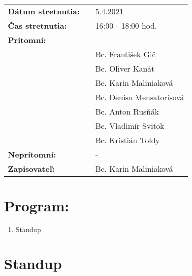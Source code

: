 \documentclass{article}
\begin{document}
    

    \begin{table}[h]
        \begin{tabular}{lllll}
            \multicolumn{3}{l}{\textbf{Dátum stretnutia:}} & & 5.4.2021 \\
            \multicolumn{3}{l}{\textbf{Čas stretnutia:}} & & 16:00 - 18:00 hod. \\
            \multicolumn{3}{l}{\textbf{Prítomní:}} \\
            & & & & Bc. František Gič  \\
            & & & & Bc. Oliver Kanát \\
            & & & & Bc. Karin Maliniaková \\
            & & & & Bc. Denisa Mensatorisová \\
            & & & & Bc. Anton Rusňák \\
            & & & & Bc. Vladimír Svitok \\
            & & & & Bc. Kristián Toldy \\
            \multicolumn{3}{l}{\textbf{Neprítomní:}} & & -\\
            \multicolumn{3}{l}{\textbf{Zapisovateľ:}} & & Bc. Karin Maliniaková \\
        \end{tabular}
        \label{tab:grades}
    \end{table}

    \section*{Program:}

    \begin{enumerate}
        \item Standup
    \end{enumerate}

    \section*{Standup}
\end{document}
